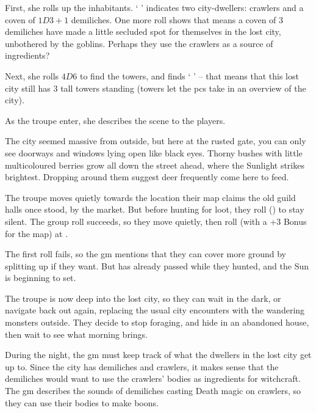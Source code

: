 \begin{multicols}{2}
\begin{exampletext}
  First, she rolls up the inhabitants.
  `  ' indicates two city-dwellers: \glspl{crawler} and a coven of $1D3+1$ demiliches.
  One more roll shows that means a coven of 3 demiliches have made a little secluded spot for themselves in the lost city, unbothered by the goblins.
  Perhaps they use the \glspl{crawler} as a source of \glspl{ingredient}?

  Next, she rolls $4D6$ to find the towers, and finds `   ' -- that means that this lost city still has 3 tall towers standing
  (towers let the \glspl{pc} take in an overview of the city).

  As the troupe enter, she describes the scene to the players.

  \begin{boxtext}
    The city seemed massive from outside, but here at the rusted gate, you can only see doorways and windows lying open like black eyes.
    Thorny bushes with little multicoloured berries grow all down the street ahead, where the Sunlight strikes brightest.
    Dropping around them suggest deer frequently come here to feed.
  \end{boxtext}

  The troupe moves quietly towards the location their map claims the old guild halls once stood, by the market.
  But before hunting for loot, they roll  (\tn[8]) to stay silent.
  The group roll succeeds, so they move quietly, then roll  (with a +3 Bonus for the map) at \tn[12].

  The first roll fails, so the \gls{gm} mentions that they can cover more ground by splitting up if they want.
  But  has already passed while they hunted, and the Sun is beginning to set.

  The troupe is now deep into the lost city, so they can wait in the dark, or navigate back out again, replacing the usual city encounters with the wandering monsters outside.
  They decide to stop foraging, and hide in an abandoned house, then wait to see what morning brings.

  During the night, the \gls{gm} must keep track of what the dwellers in the lost city get up to.
  Since the city has demiliches and \glspl{crawler}, it makes sense that the demiliches would want to use the \glspl{crawler}' bodies as \glspl{ingredient} for \gls{witchcraft}.
  The \gls{gm} describes the sounds of demiliches casting Death magic on \glspl{crawler}, so they can use their bodies to make \glspl{boon}.


\end{exampletext}
\end{multicols}
